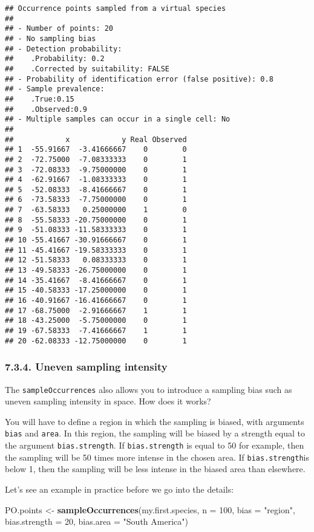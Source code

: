 \documentclass[]{article}
\newenvironment{Shaded}{\begin{snugshade}}{\end{snugshade}}
\newcommand{\KeywordTok}[1]{\textcolor[rgb]{0.13,0.29,0.53}{\textbf{#1}}}
\newcommand{\DataTypeTok}[1]{\textcolor[rgb]{0.13,0.29,0.53}{#1}}
\newcommand{\DecValTok}[1]{\textcolor[rgb]{0.00,0.00,0.81}{#1}}
\newcommand{\StringTok}[1]{\textcolor[rgb]{0.31,0.60,0.02}{#1}}
\newcommand{\NormalTok}[1]{#1}
\begin{document}
\begin{verbatim}
## Occurrence points sampled from a virtual species
## 
## - Number of points: 20
## - No sampling bias
## - Detection probability: 
##    .Probability: 0.2
##    .Corrected by suitability: FALSE
## - Probability of identification error (false positive): 0.8
## - Sample prevalence: 
##    .True:0.15
##    .Observed:0.9
## - Multiple samples can occur in a single cell: No
## 
##            x            y Real Observed
## 1  -55.91667  -3.41666667    0        0
## 2  -72.75000  -7.08333333    0        1
## 3  -72.08333  -9.75000000    0        1
## 4  -62.91667  -1.08333333    0        1
## 5  -52.08333  -8.41666667    0        1
## 6  -73.58333  -7.75000000    0        1
## 7  -63.58333   0.25000000    1        0
## 8  -55.58333 -20.75000000    0        1
## 9  -51.08333 -11.58333333    0        1
## 10 -55.41667 -30.91666667    0        1
## 11 -45.41667 -19.58333333    0        1
## 12 -51.58333   0.08333333    0        1
## 13 -49.58333 -26.75000000    0        1
## 14 -35.41667  -8.41666667    0        1
## 15 -40.58333 -17.25000000    0        1
## 16 -40.91667 -16.41666667    0        1
## 17 -68.75000  -2.91666667    1        1
## 18 -43.25000  -5.75000000    0        1
## 19 -67.58333  -7.41666667    1        1
## 20 -62.08333 -12.75000000    0        1
\end{verbatim}

\hypertarget{uneven-sampling-intensity}{\subsubsection{7.3.4. Uneven
sampling intensity}\label{uneven-sampling-intensity}}

The \texttt{sampleOccurrences} also allows you to introduce a sampling
bias such as uneven sampling intensity in space. How does it works?

You will have to define a region in which the sampling is biased, with
arguments \texttt{bias} and \texttt{area}. In this region, the sampling
will be biased by a strength equal to the argument
\texttt{bias.strength}. If \texttt{bias.strength} is equal to 50 for
example, then the sampling will be 50 times more intense in the chosen
area. If \texttt{bias.strength}is below 1, then the sampling will be
less intense in the biased area than elsewhere.

Let's see an example in practice before we go into the details:

\begin{Shaded}
\begin{Highlighting}[]
\NormalTok{PO.points <-}\StringTok{ }\KeywordTok{sampleOccurrences}\NormalTok{(my.first.species,}
                               \DataTypeTok{n =} \DecValTok{100}\NormalTok{, }
                               \DataTypeTok{bias =} \StringTok{"region"}\NormalTok{,}
                               \DataTypeTok{bias.strength =} \DecValTok{20}\NormalTok{,}
                               \DataTypeTok{bias.area =} \StringTok{"South America"}\NormalTok{)}
\end{Highlighting}
\end{Shaded}
\end{document}
